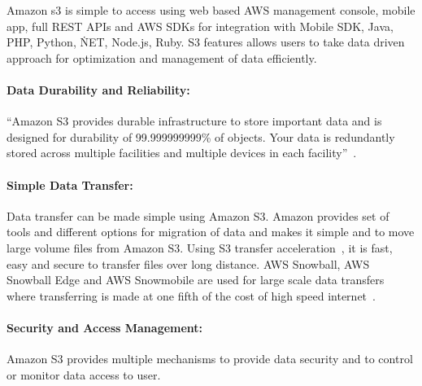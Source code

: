 Amazon s3 is simple to access using web based AWS management console, mobile
app, full REST APIs and AWS SDKs for integration with Mobile SDK, Java, PHP,
Python, \.NET,
Node.js, Ruby. S3 features allows users to take data driven
approach for optimization and management of data efficiently.



\paragraph{Data Durability and Reliability: } 

``Amazon S3 provides durable infrastructure to store important data and is
designed for durability of 99.999999999\% of objects. Your data is redundantly
stored across multiple facilities and multiple devices in each
facility''~\cite{hid-sp18-420-amazon-S3}.

\paragraph{Simple Data Transfer: } 

Data transfer can be made simple using Amazon S3. Amazon provides set of tools
and different options for migration of data and makes it simple and to move
large volume files from Amazon S3. Using S3 transfer
acceleration~\cite{hid-sp18-420-amazon-S3-dataTransfer-FAQ}, it is fast, easy
and secure to
transfer files over long distance. AWS Snowball, AWS Snowball Edge and AWS
Snowmobile are used for large scale data transfers where transferring is made
at one fifth of the cost of high speed
internet~\cite{hid-sp18-420-amazon-S3-cloud-migration}.

\paragraph{Security and Access Management: } 

Amazon S3 provides multiple mechanisms to provide data security and to control
or monitor data access to user.

